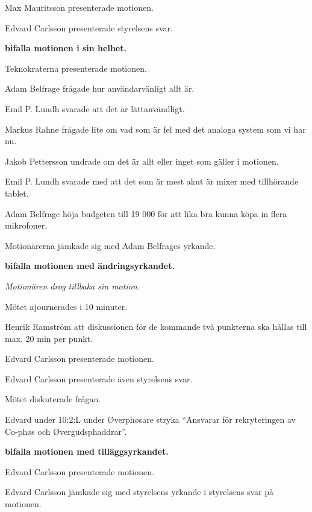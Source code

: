 \documentclass[10pt]{article}
\begin{document}
\begin{paragrafer}
\begin{paragrafer}
    Max Mauritsson presenterade motionen.

    Edvard Carlsson presenterade styrelsens svar.

    \textbf{\Mba bifalla motionen i sin helhet.}

    Teknokraterna presenterade motionen.

    Adam Belfrage frågade hur användarvänligt allt är.

    Emil P. Lundh svarade att det är lättanvändligt.

    Markus Rahne frågade lite om vad som är fel med det analoga system som vi har nu.

    Jakob Pettersson undrade om det är allt eller inget som gäller i motionen.

    Emil P. Lundh svarade med att det som är mest akut är mixer med tillhörande tablet.

    Adam Belfrage \ypa höja budgeten till 19 000 för att lika bra kunna köpa in flera mikrofoner.

    Motionärerna jämkade sig med Adam Belfrages yrkande.

    \textbf{\Mba bifalla motionen med ändringsyrkandet.}

    
    \textit{Motionären drog tillbaka sin motion.}

    Mötet ajournerades i 10 minuter.

    Henrik Ramström \ypa att diskussionen för de kommande två punkterna ska hållas till max. 20 min 
    per punkt.

    \Mbaby

    Edvard Carlsson presenterade motionen.

    Edvard Carlsson presenterade även styrelsens svar.

    Mötet diskuterade frågan.

    Edvard \ypa under 10:2:L under Øverphøsare stryka ``Ansvarar för rekryteringen av Co-phøs och Øvergudsphaddrar''.

    \textbf{\Mba bifalla motionen med tilläggsyrkandet.} 

    Edvard Carlsson presenterade motionen. 

    Edvard Carlsson jämkade sig med styrelsens yrkande i styrelsens svar på motionen.


\end{paragrafer}
\end{paragrafer}
\end{document}
